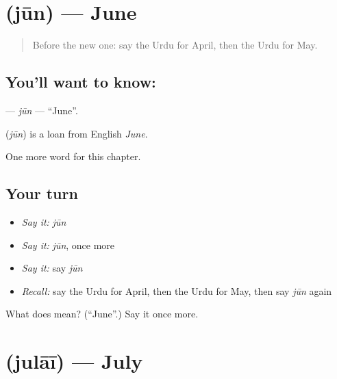 \section[\texorpdfstring{\ur{جون} (jūn)}{جون (jūn)}]{ (jūn) — June}

\label{lesson:UR-C188-jun}



\begin{quote}
Before the new one: say the Urdu for April, then the Urdu for May.
\end{quote}

\subsection*{You'll want to know: }
\textbf{} — \emph{jūn} — \textquotedblleft{}June\textquotedblright{}.

\begin{cousinweb}
\textbf{} (\emph{jūn}) is a loan from English \emph{June}.
\end{cousinweb}

\begin{grammarlens}[title={What you've built}]
One more word for this chapter.
\end{grammarlens}

\subsection*{Your turn}
\begin{itemize}
\raggedright
  \item \emph{Say it:} \emph{jūn}
  \item \emph{Say it:} \emph{jūn}, once more
  \item \emph{Say it:} say \emph{jūn}
  \item \emph{Recall:} say the Urdu for April, then the Urdu for May, then say \emph{jūn} again
\end{itemize}

\begin{tcolorbox}[breakable,colback=teal!4,colframe=teal!35!black,title={Before you move on}]
What does  mean? (\textquotedblleft{}June\textquotedblright{}.) Say it once more.
\end{tcolorbox}
\section[\texorpdfstring{\ur{جولائی} (julāī)}{جولائی (julāī)}]{ (julāī) — July}

